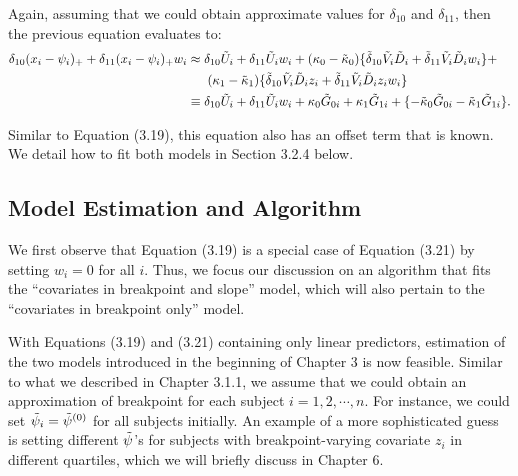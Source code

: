 \documentclass [12pt, proquest] {uwthesis}[2016/11/22]
\begin{document}
Again, assuming that we could obtain approximate values for $\delta_{10}$ and $\delta_{11}$, then the previous equation evaluates to:
\begin{align}
    \delta_{10} (x_i - \psi_i)_+ + \delta_{11} (x_i - \psi_i)_+ w_i &\approx \delta_{10} \Tilde{U}_i + \delta_{11} \Tilde{U}_i w_i + (\kappa_0 - \Tilde{\kappa}_0) \{\Tilde{\delta}_{10} \Tilde{V}_i \Tilde{D}_i + \Tilde{\delta}_{11} \Tilde{V}_i \Tilde{D}_i w_i \} + \nonumber \\
    & \hspace{0.22in} (\kappa_1 - \Tilde{\kappa}_1) \{\Tilde{\delta}_{10} \Tilde{V}_i \Tilde{D}_i z_i + \Tilde{\delta}_{11} \Tilde{V}_i \Tilde{D}_i z_i w_i \} \nonumber \\
    &\equiv \delta_{10} \Tilde{U}_i + \delta_{11} \Tilde{U}_i w_i + \kappa_0 \Tilde{G}_{0i} + \kappa_1 \Tilde{G}_{1i} + \{ -\Tilde{\kappa}_0 \Tilde{G}_{0i} -\Tilde{\kappa}_1 \Tilde{G}_{1i}\}.
\end{align}

Similar to Equation (3.19), this equation also has an offset term that is known. We detail how to fit both models in Section 3.2.4 below.

\subsection{Model Estimation and Algorithm}
We first observe that Equation (3.19) is a special case of Equation (3.21) by setting $w_i = 0$ for all $i$. Thus, we focus our discussion on an algorithm that fits the ``covariates in breakpoint and slope'' model, which will also pertain to the ``covariates in breakpoint only'' model.

With Equations (3.19) and (3.21) containing only linear predictors, estimation of the two models introduced in the beginning of Chapter 3 is now feasible. Similar to what we described in Chapter 3.1.1, we assume that we could obtain an approximation of breakpoint for each subject $i = 1, 2, \cdots, n$. For instance, we could set $\Tilde{\psi}_i = \Tilde{\psi}^{(0)}$ for all subjects initially. An example of a more sophisticated guess is setting different $\Tilde{\psi}$'s for subjects with breakpoint-varying covariate $z_i$ in different quartiles, which we will briefly discuss in Chapter 6.
\end{document}
